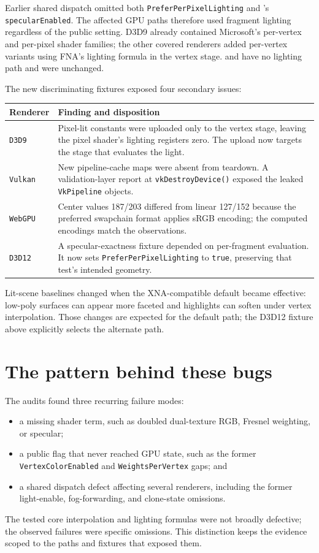 Earlier shared dispatch omitted both \texttt{PreferPerPixelLighting} and
's \texttt{specularEnabled}. The affected GPU paths therefore
used fragment lighting regardless of the public setting. D3D9 already contained Microsoft's
per-vertex and per-pixel shader families; the other covered renderers added per-vertex variants
using FNA's lighting formula in the vertex stage.  and
 have no lighting path and were unchanged.

The new discriminating fixtures exposed four secondary issues:

\begin{longtable}{@{}p{}p{}@{}}
\toprule
Renderer & Finding and disposition \\
\midrule
\endhead
\texttt{D3D9} & Pixel-lit constants were uploaded only to the vertex stage, leaving the pixel
shader's lighting registers zero. The upload now targets the stage that evaluates the light. \\
\texttt{Vulkan} & New pipeline-cache maps were absent from teardown. A validation-layer report
at \texttt{vkDestroyDevice()} exposed the leaked \texttt{VkPipeline} objects. \\
\texttt{WebGPU} & Center values 187/203 differed from linear 127/152 because the preferred
swapchain format applies sRGB encoding; the computed encodings match the observations. \\
\texttt{D3D12} & A specular-exactness fixture depended on per-fragment evaluation. It now sets
\texttt{PreferPerPixelLighting} to \texttt{true}, preserving that test's intended geometry. \\
\bottomrule
\end{longtable}

Lit-scene baselines changed when the XNA-compatible default became effective: low-poly surfaces
can appear more faceted and highlights can soften under vertex interpolation. Those changes are
expected for the default path; the D3D12 fixture above explicitly selects the alternate path.

\section{The pattern behind these bugs}

The audits found three recurring failure modes:

\begin{itemize}
  \item a missing shader term, such as doubled dual-texture RGB, Fresnel weighting, or specular;
  \item a public flag that never reached GPU state, such as the former
        \texttt{VertexColorEnabled} and \texttt{WeightsPerVertex} gaps; and
  \item a shared dispatch defect affecting several renderers, including the former light-enable,
        fog-forwarding, and clone-state omissions.
\end{itemize}

The tested core interpolation and lighting formulas were not broadly defective; the observed
failures were specific omissions. This distinction keeps the evidence scoped to the paths and
fixtures that exposed them.
